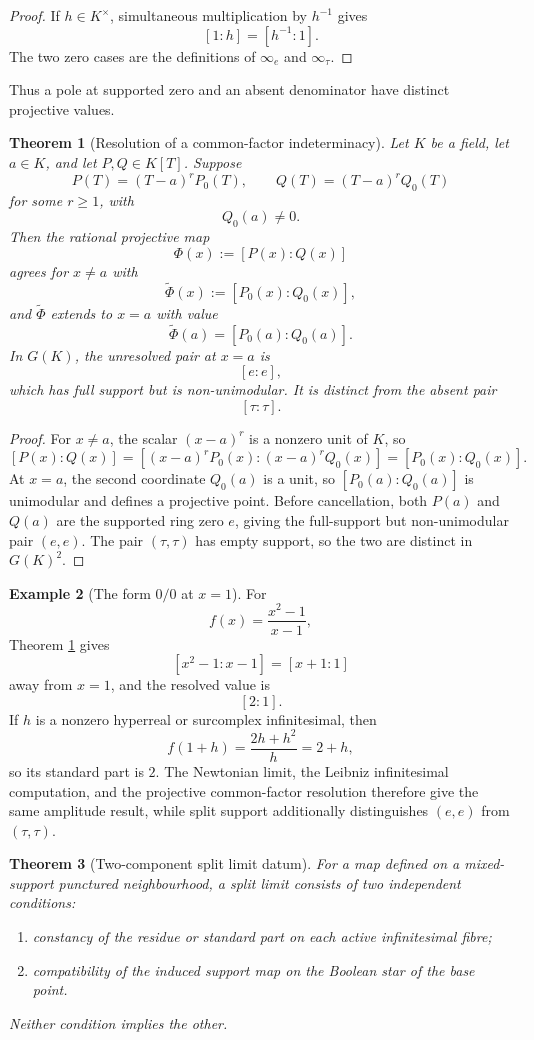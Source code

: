 \documentclass[11pt]{amsart}
\numberwithin{equation}{section}
\newtheorem{theorem}{Theorem}[section]
\theoremstyle{definition}
\newtheorem{example}[theorem]{Example}
\begin{document}
\begin{proof}
If $h\in K^\times$, simultaneous multiplication by $h^{-1}$ gives
\[
[1:h]=[h^{-1}:1].
\]
The two zero cases are the definitions of $\infty_e$ and $\infty_\tau$.
\end{proof}

Thus a pole at supported zero and an absent denominator have distinct projective values.

\begin{theorem}[Resolution of a common-factor indeterminacy]\label{thm:common-factor-resolution}
Let $K$ be a field, let $a\in K$, and let $P,Q\in K[T]$.  Suppose
\[
P(T)=(T-a)^rP_0(T),
\qquad
Q(T)=(T-a)^rQ_0(T)
\]
for some $r\ge1$, with
\[
Q_0(a)\neq0.
\]
Then the rational projective map
\[
\Phi(x):=[P(x):Q(x)]
\]
agrees for $x\neq a$ with
\[
\widetilde\Phi(x):=[P_0(x):Q_0(x)],
\]
and $\widetilde\Phi$ extends to $x=a$ with value
\[
\widetilde\Phi(a)=[P_0(a):Q_0(a)].
\]
In $G(K)$, the unresolved pair at $x=a$ is
\[
[e:e],
\]
which has full support but is non-unimodular.  It is distinct from the absent pair
\[
[\tau:\tau].
\]
\end{theorem}

\begin{proof}
For $x\neq a$, the scalar $(x-a)^r$ is a nonzero unit of $K$, so
\[
[P(x):Q(x)]
=
[(x-a)^rP_0(x):(x-a)^rQ_0(x)]
=
[P_0(x):Q_0(x)].
\]
At $x=a$, the second coordinate $Q_0(a)$ is a unit, so $[P_0(a):Q_0(a)]$ is unimodular and defines a projective point.  Before cancellation, both $P(a)$ and $Q(a)$ are the supported ring zero $e$, giving the full-support but non-unimodular pair $(e,e)$.  The pair $(\tau,\tau)$ has empty support, so the two are distinct in $G(K)^2$.
\end{proof}

\begin{example}[The form $0/0$ at $x=1$]
For
\[
f(x)=\frac{x^2-1}{x-1},
\]
Theorem \ref{thm:common-factor-resolution} gives
\[
[x^2-1:x-1]=[x+1:1]
\]
away from $x=1$, and the resolved value is
\[
[2:1].
\]
If $h$ is a nonzero hyperreal or surcomplex infinitesimal, then
\[
f(1+h)=\frac{2h+h^2}{h}=2+h,
\]
so its standard part is $2$.  The Newtonian limit, the Leibniz infinitesimal computation, and the projective common-factor resolution therefore give the same amplitude result, while split support additionally distinguishes $(e,e)$ from $(\tau,\tau)$.
\end{example}

\begin{theorem}[Two-component split limit datum]\label{thm:two-component-limit}
For a map defined on a mixed-support punctured neighbourhood, a split limit consists of two independent conditions:
\begin{enumerate}[label=\textup{(\alph*)}]
\item constancy of the residue or standard part on each active infinitesimal fibre;
\item compatibility of the induced support map on the Boolean star of the base point.
\end{enumerate}
Neither condition implies the other.
\end{theorem}
\end{document}
